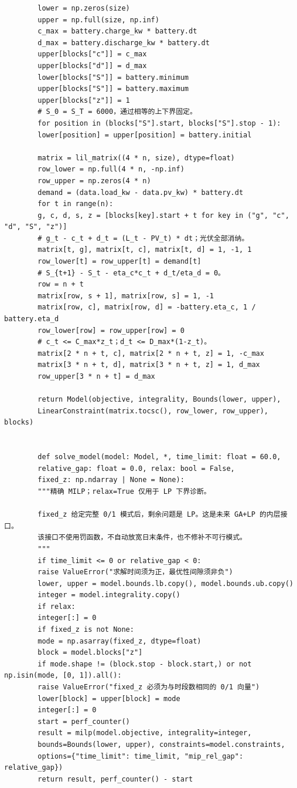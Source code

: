 \documentclass[UTF8]{ctexart}
\begin{document}
\begin{verbatim}
        lower = np.zeros(size)
        upper = np.full(size, np.inf)
        c_max = battery.charge_kw * battery.dt
        d_max = battery.discharge_kw * battery.dt
        upper[blocks["c"]] = c_max
        upper[blocks["d"]] = d_max
        lower[blocks["S"]] = battery.minimum
        upper[blocks["S"]] = battery.maximum
        upper[blocks["z"]] = 1
        # S_0 = S_T = 6000，通过相等的上下界固定。
        for position in (blocks["S"].start, blocks["S"].stop - 1):
        lower[position] = upper[position] = battery.initial
        
        matrix = lil_matrix((4 * n, size), dtype=float)
        row_lower = np.full(4 * n, -np.inf)
        row_upper = np.zeros(4 * n)
        demand = (data.load_kw - data.pv_kw) * battery.dt
        for t in range(n):
        g, c, d, s, z = [blocks[key].start + t for key in ("g", "c", "d", "S", "z")]
        # g_t - c_t + d_t = (L_t - PV_t) * dt；光伏全部消纳。
        matrix[t, g], matrix[t, c], matrix[t, d] = 1, -1, 1
        row_lower[t] = row_upper[t] = demand[t]
        # S_{t+1} - S_t - eta_c*c_t + d_t/eta_d = 0。
        row = n + t
        matrix[row, s + 1], matrix[row, s] = 1, -1
        matrix[row, c], matrix[row, d] = -battery.eta_c, 1 / battery.eta_d
        row_lower[row] = row_upper[row] = 0
        # c_t <= C_max*z_t；d_t <= D_max*(1-z_t)。
        matrix[2 * n + t, c], matrix[2 * n + t, z] = 1, -c_max
        matrix[3 * n + t, d], matrix[3 * n + t, z] = 1, d_max
        row_upper[3 * n + t] = d_max
        
        return Model(objective, integrality, Bounds(lower, upper),
        LinearConstraint(matrix.tocsc(), row_lower, row_upper), blocks)
        
        
        def solve_model(model: Model, *, time_limit: float = 60.0,
        relative_gap: float = 0.0, relax: bool = False,
        fixed_z: np.ndarray | None = None):
        """精确 MILP；relax=True 仅用于 LP 下界诊断。
        
        fixed_z 给定完整 0/1 模式后，剩余问题是 LP。这是未来 GA+LP 的内层接口。
        该接口不使用罚函数，不自动放宽日末条件，也不修补不可行模式。
        """
        if time_limit <= 0 or relative_gap < 0:
        raise ValueError("求解时间须为正，最优性间隙须非负")
        lower, upper = model.bounds.lb.copy(), model.bounds.ub.copy()
        integer = model.integrality.copy()
        if relax:
        integer[:] = 0
        if fixed_z is not None:
        mode = np.asarray(fixed_z, dtype=float)
        block = model.blocks["z"]
        if mode.shape != (block.stop - block.start,) or not np.isin(mode, [0, 1]).all():
        raise ValueError("fixed_z 必须为与时段数相同的 0/1 向量")
        lower[block] = upper[block] = mode
        integer[:] = 0
        start = perf_counter()
        result = milp(model.objective, integrality=integer,
        bounds=Bounds(lower, upper), constraints=model.constraints,
        options={"time_limit": time_limit, "mip_rel_gap": relative_gap})
        return result, perf_counter() - start
        

\end{verbatim}
\end{document}

